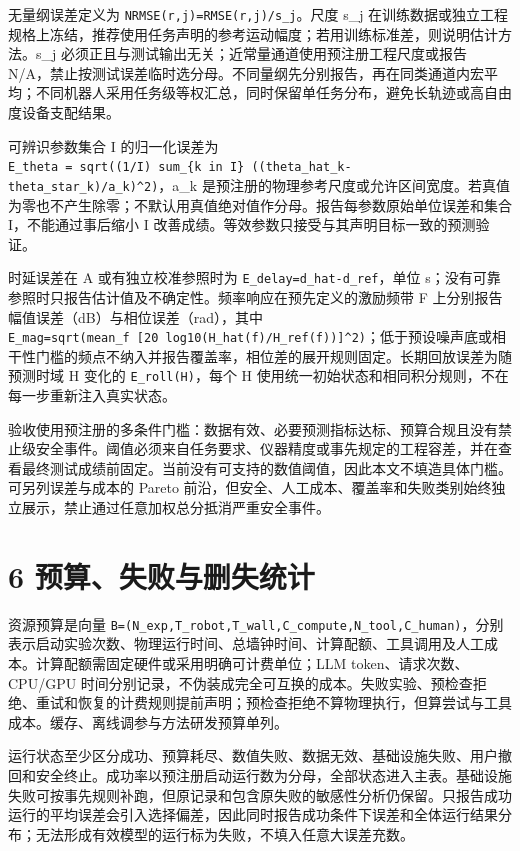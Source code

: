 \documentclass[
  chinese,
  11pt,
  a4paper,
  fontset=fandol]{ctexart}
\begin{document}
无量纲误差定义为 \texttt{NRMSE(r,j)=RMSE(r,j)/s\_j}。尺度 s\_j
在训练数据或独立工程规格上冻结，推荐使用任务声明的参考运动幅度；若用训练标准差，则说明估计方法。s\_j
必须正且与测试输出无关；近常量通道使用预注册工程尺度或报告
N/A，禁止按测试误差临时选分母。不同量纲先分别报告，再在同类通道内宏平均；不同机器人采用任务级等权汇总，同时保留单任务分布，避免长轨迹或高自由度设备支配结果。

可辨识参数集合 I 的归一化误差为
\texttt{E\_theta\ =\ sqrt((1/\textbar{}I\textbar{})\ sum\_\{k\ in\ I\}\ ((theta\_hat\_k-theta\_star\_k)/a\_k)\^{}2)}，a\_k
是预注册的物理参考尺度或允许区间宽度。若真值为零也不产生除零；不默认用真值绝对值作分母。报告每参数原始单位误差和集合
I，不能通过事后缩小 I
改善成绩。等效参数只接受与其声明目标一致的预测验证。

时延误差在 A 或有独立校准参照时为
\texttt{E\_delay=\textbar{}d\_hat-d\_ref\textbar{}}，单位
s；没有可靠参照时只报告估计值及不确定性。频率响应在预先定义的激励频带 F
上分别报告幅值误差（dB）与相位误差（rad），其中
\texttt{E\_mag=sqrt(mean\_f\ {[}20\ log10(\textbar{}H\_hat(f)\textbar{}/\textbar{}H\_ref(f)\textbar{}){]}\^{}2)}；低于预设噪声底或相干性门槛的频点不纳入并报告覆盖率，相位差的展开规则固定。长期回放误差为随预测时域
H 变化的 \texttt{E\_roll(H)}，每个 H
使用统一初始状态和相同积分规则，不在每一步重新注入真实状态。

验收使用预注册的多条件门槛：数据有效、必要预测指标达标、预算合规且没有禁止级安全事件。阈值必须来自任务要求、仪器精度或事先规定的工程容差，并在查看最终测试成绩前固定。当前没有可支持的数值阈值，因此本文不填造具体门槛。可另列误差与成本的
Pareto
前沿，但安全、人工成本、覆盖率和失败类别始终独立展示，禁止通过任意加权总分抵消严重安全事件。

\section{6
预算、失败与删失统计}\label{ux9884ux7b97ux5931ux8d25ux4e0eux5220ux5931ux7edfux8ba1}

资源预算是向量
\texttt{B=(N\_exp,T\_robot,T\_wall,C\_compute,N\_tool,C\_human)}，分别表示启动实验次数、物理运行时间、总墙钟时间、计算配额、工具调用及人工成本。计算配额需固定硬件或采用明确可计费单位；LLM
token、请求次数、CPU/GPU
时间分别记录，不伪装成完全可互换的成本。失败实验、预检查拒绝、重试和恢复的计费规则提前声明；预检查拒绝不算物理执行，但算尝试与工具成本。缓存、离线调参与方法研发预算单列。

运行状态至少区分成功、预算耗尽、数值失败、数据无效、基础设施失败、用户撤回和安全终止。成功率以预注册启动运行数为分母，全部状态进入主表。基础设施失败可按事先规则补跑，但原记录和包含原失败的敏感性分析仍保留。只报告成功运行的平均误差会引入选择偏差，因此同时报告成功条件下误差和全体运行结果分布；无法形成有效模型的运行标为失败，不填入任意大误差充数。
\end{document}
